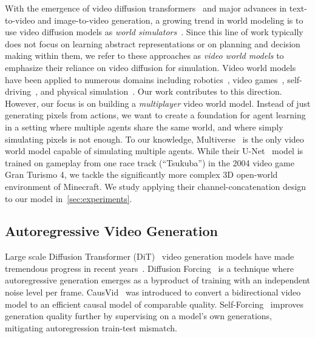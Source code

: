 With the emergence of video diffusion transformers~\cite{peebles2023scalablediffusionmodelstransformers} and major advances in text-to-video and image-to-video generation, a growing trend in world modeling is to use video diffusion models as \emph{world simulators}~\cite{openai2024sora,yang2023unisim, liang2024dreamitate, bar2025navigation}. Since this line of work typically does not focus on learning abstract representations or on planning and decision making within them, we refer to these approaches as \emph{video world models} to emphasize their reliance on video diffusion for simulation. Video world models have been applied to numerous domains including robotics~\cite{mereu2025generative, yang2024learninginteractiverealworldsimulators, li2025unified,li2026causal,ye2026world,gao2026dreamdojo}, video games~\cite{oasis2024, parkerholder_fruchter_2025_genie3, valevski2025diffusionmodelsrealtimegame, alonso2024diffusionworldmodelingvisual, he2025matrixgame20opensourcerealtime, xiao2025worldmem}, self-driving~\cite{agarwal2025cosmos,hu2023gaia,waymo2026wm}, and physical simulation~\cite{li2025pisa, yuan2026inference}. Our work contributes to this direction. However, our focus is on building a \emph{multiplayer} video world model. Instead of just generating pixels from actions, we want to create a foundation for agent learning in a setting where multiple agents share the same world, and where simply simulating pixels is not enough. To our knowledge, Multiverse~\cite{enigma2025multiverse} is the only video world model capable of simulating multiple agents. While their U-Net~\cite{ronneberger2015u} model is trained on gameplay from one race track (``Tsukuba'') in the 2004 video game Gran Turismo 4, we tackle the significantly more complex 3D open-world environment of Minecraft. We study applying their channel-concatenation design to our model in~\cref{sec:experiments}.








\subsection{Autoregressive Video Generation}

Large scale Diffusion Transformer (DiT)~\cite{peebles2023scalablediffusionmodelstransformers} video generation models have made tremendous progress in recent years~\cite{openai2024sora, kong2025hunyuanvideosystematicframeworklarge, wan2025wanopenadvancedlargescale}. Diffusion Forcing~\cite{chen2024diffusionforcingnexttokenprediction} is a technique where autoregressive generation emerges as a byproduct of training with an independent noise level per frame. CausVid~\cite{yin2025slowbidirectionalfastautoregressive} was introduced to convert a bidirectional video model to an efficient causal model of comparable quality. Self-Forcing~\cite{huang2025selfforcingbridgingtraintest,cui2025self, hong2025relic} improves generation quality further by supervising on a model's own generations, mitigating autoregression train-test mismatch.  

